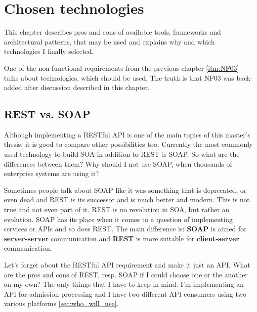 \chapter{Chosen technologies}\label{cha:technologies}

	This chapter describes pros and cons of available tools, frameworks and architectural patterns, that may be used and
	explains why and which technologies I finally selected.
	
	One of the non-functional requirements from the previous chapter \ref{itm:NF03} talks about technologies, which should
	be used. The truth is that NF03 was back-added after discussion described in this chapter.

	\section{REST vs. SOAP}
	
	Although implementing a RESTful API is one of the main topics of this master's thesis, it is good to compare other
	possibilities too. Currently the most commonly used technology to build SOA in addition to REST is SOAP. So what are
	the differences between them? Why should I not use SOAP, when thousands of enterprise systems are using it?
	
	Sometimes people talk about SOAP like it was something that is deprecated, or even dead and REST is its successor and
	is much better and modern. This is not true and not even part of it. REST is no revolution in SOA, but rather
	an evolution. SOAP has its place when it comes to a question of implementing services or APIs and so does REST. The
	main difference is: \textbf{SOAP} is aimed for \textbf{server-server} communication and \textbf{REST} is more suitable
	for \textbf{client-server} communication.
	
	Let's forget about the RESTful API requirement and make it just an API. What are the pros and cons of REST, resp. SOAP
	if I could choose one or the another on my own? The only things that I have to keep in mind: I'm implementing an API
	for admission processing and I have two different API consumers using two various platforms \ref{sec:who_will_use}.
	
